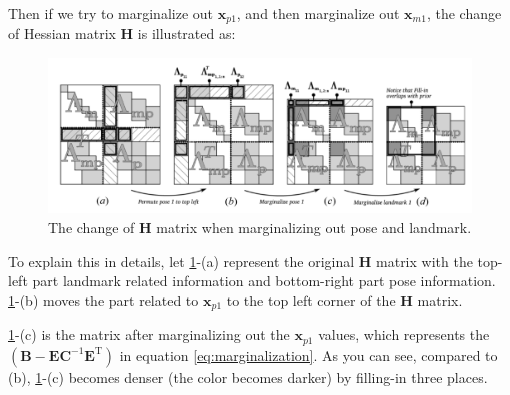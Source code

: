 \documentclass[12pt]{report}   %
\begin{document}
Then if we try to marginalize out $\bm{x}_{p1}$, and then marginalize out $\bm{x}_{m1}$, the change of Hessian matrix $\bm{H}$ is illustrated as:

\begin{figure}[H]
	\centering
	\includegraphics[width=1.0\linewidth]{figures/marg_process_fillin.png}
	\caption{The change of $\bm{H}$ matrix when marginalizing out pose and landmark.}
	\label{fig:marg_process_fillin}
\end{figure}

To explain this in details, let \ref{fig:marg_process_fillin}-(a) represent the original $\bm{H}$ matrix with the top-left part landmark related information and bottom-right part pose information. \ref{fig:marg_process_fillin}-(b) moves the part related to $\bm{x}_{p1}$ to the top left corner of the $\bm{H}$ matrix.

\ref{fig:marg_process_fillin}-(c) is the matrix after marginalizing out the $\bm{x}_{p1}$ values, which represents the $\left( \bm{B} - \bm{E}\bm{C}^{-1}\bm{E}^\mathrm{T} \right)$ in equation \eqref{eq:marginalization}. As you can see, compared to (b), \ref{fig:marg_process_fillin}-(c) becomes denser (the color becomes darker) by filling-in three places.
\end{document}
